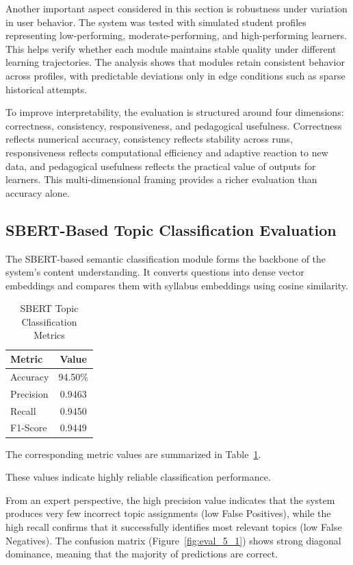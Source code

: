 \begin{sloppypar}
Another important aspect considered in this section is robustness under variation in user behavior. The system was tested with simulated student profiles representing low-performing, moderate-performing, and high-performing learners. This helps verify whether each module maintains stable quality under different learning trajectories. The analysis shows that modules retain consistent behavior across profiles, with predictable deviations only in edge conditions such as sparse historical attempts.

To improve interpretability, the evaluation is structured around four dimensions: correctness, consistency, responsiveness, and pedagogical usefulness. Correctness reflects numerical accuracy, consistency reflects stability across runs, responsiveness reflects computational efficiency and adaptive reaction to new data, and pedagogical usefulness reflects the practical value of outputs for learners. This multi-dimensional framing provides a richer evaluation than accuracy alone.

\subsection{SBERT-Based Topic Classification Evaluation}

The SBERT-based semantic classification module forms the backbone of the system's content understanding. It converts questions into dense vector embeddings and compares them with syllabus embeddings using cosine similarity.

\begin{table}[H]
\centering
\caption{SBERT Topic Classification Metrics}
\label{tab:sbert_metrics}
\begin{tabular}{|l|c|}
\hline
Metric & Value \\
\hline
Accuracy & 94.50\% \\
\hline
Precision & 0.9463 \\
\hline
Recall & 0.9450 \\
\hline
F1-Score & 0.9449 \\
\hline
\end{tabular}
\end{table}

The corresponding metric values are summarized in Table~\ref{tab:sbert_metrics}.

These values indicate highly reliable classification performance.

From an expert perspective, the high precision value indicates that the system produces very few incorrect topic assignments (low False Positives), while the high recall confirms that it successfully identifies most relevant topics (low False Negatives). The confusion matrix (Figure~\ref{fig:eval_5_1}) shows strong diagonal dominance, meaning that the majority of predictions are correct.


\end{sloppypar}

